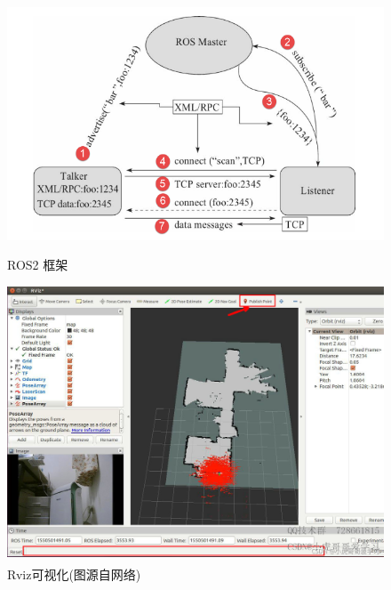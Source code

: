 \documentclass[a4paper,twoside]{article}
\newcommand{\upcite}[1]{\textsuperscript{\textsuperscript{\cite{#1}}}}
\begin{document}
\begin{figure}[htbp]
	\centering
	\begin{minipage}{0.49\linewidth}
		\centering
		\includegraphics[width=1.0\linewidth]{rosframework.png}
		\caption{ROS2 框架}
	\end{minipage}
	\begin{minipage}{0.49\linewidth}
		\centering
		\includegraphics[width=0.9\linewidth]{rviz.png}
		\caption{Rviz可视化(图源自网络)\upcite{rvizvisual}}
	\end{minipage}
\end{figure}
\end{document}
